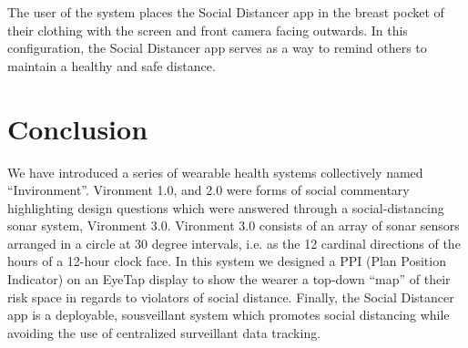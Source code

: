 \documentclass[journal]{journal}
\begin{document}
The user of the system places the Social Distancer app in the breast pocket of their clothing with the screen and front camera facing outwards. In this configuration, the Social Distancer app serves as a way to remind others to maintain a healthy and safe distance.











\section{Conclusion}
We have introduced a series of wearable health systems collectively named ``Invironment''.
Vironment 1.0, and 2.0 were forms of social commentary highlighting design
questions which were answered through a social-distancing sonar system,
Vironment 3.0.  Vironment 3.0 consists of an array of sonar sensors arranged in a circle at 30 degree intervals, i.e. as the 12 cardinal directions of the hours of a 12-hour clock face.  In this system we designed a PPI (Plan Position Indicator) on an EyeTap
display to show the wearer a top-down ``map'' of their risk space in regards to
violators of social distance. Finally, the Social Distancer app is a deployable, sousveillant system which promotes social distancing while avoiding the use of centralized surveillant data tracking.
\end{document}
